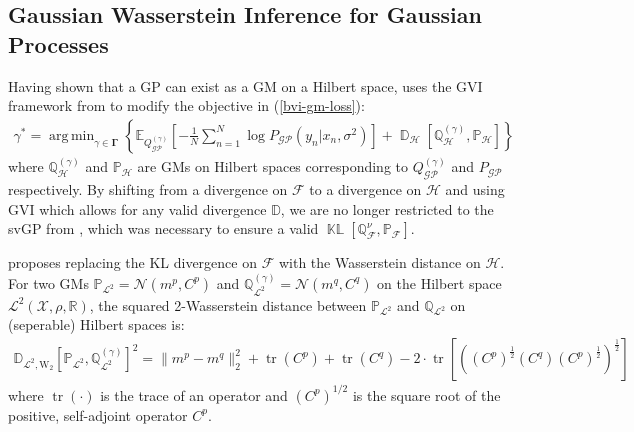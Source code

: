 \documentclass{article}
\newcommand{\KLD}{\operatorname{\mathbb{KL}}}
\newcommand{\D}{\operatorname{\mathbb{D}}}
\newcommand{\tr}{\operatorname{tr}}
\newcommand{\GP}{\operatorname{\mathcal{GP}}}
\DeclareMathOperator*{\argmin}{arg\,min}
\numberwithin{equation}{section}
\begin{document}
\subsection{Gaussian Wasserstein Inference for Gaussian Processes}
Having shown that a GP can exist as a GM on a Hilbert space, \cite{wild2022generalized} uses the GVI framework from \cite{knoblauch2022optimization} to modify the objective in (\ref{bvi-gm-loss}):
\begin{align}
    \label{gwi-objective}
    \gamma^* = \argmin_{\gamma \in \boldsymbol{\Gamma}}\left\{ \mathbb{E}_{Q^{(\gamma)}_{\GP}}\left[- \frac{1}{N}\sum_{n=1}^N \log P_{\GP}\left(y_n \vert x_n, \sigma^2\right) \right] + \D_{\mathcal{H}} \left[\mathbb{Q}^{(\gamma)}_{\mathcal{H}}, \mathbb{P}_{\mathcal{H}} \right]\right\}
\end{align}
where $\mathbb{Q}^{(\gamma)}_{\mathcal{H}}$ and $\mathbb{P}_{\mathcal{H}}$ are GMs on Hilbert spaces corresponding to $Q^{(\gamma)}_{\GP}$ and $P_{\GP}$ respectively. By shifting from a divergence on $\mathcal{F}$ to a divergence on $\mathcal{H}$ and using GVI which allows for any valid divergence $\mathbb{D}$, we are no longer restricted to the svGP from \cite{titsias2009variational}, which was necessary to ensure a valid $\KLD\left[\mathbb{Q}^{\nu}_{\mathcal{F}},  \mathbb{P}_{\mathcal{F}}\right]$.

\cite{wild2022generalized} proposes replacing the KL divergence on $\mathcal{F}$ with the Wasserstein distance on $\mathcal{H}$. For two GMs $\mathbb{P}_{\mathcal{L}^2} = \mathcal{N}(m^p, C^p)$ and $\mathbb{Q}^{(\gamma)}_{\mathcal{L}^2} = \mathcal{N}(m^q, C^q)$ on the Hilbert space $\mathcal{L}^2(\mathcal{X}, \rho, \mathbb{R})$, the squared 2-Wasserstein distance between $\mathbb{P}_{\mathcal{L}^2}$ and $\mathbb{Q}_{\mathcal{L}^2}$ on (seperable) Hilbert spaces is:
\begin{align}
    \mathbb{D}_{\mathcal{L}^2, \text{W}_2} \left[\mathbb{P}_{\mathcal{L}^2}, \mathbb{Q}^{(\gamma)}_{\mathcal{L}^2}\right]^2 = \| m^p - m^q\|_2^2 + \tr(C^p) + \tr(C^q) - 2 \cdot \tr \left[ \left( \left(C^p\right)^{\frac{1}{2}} \left(C^q\right) \left(C^p\right)^{\frac{1}{2}}\right)^{\frac{1}{2}}\right]
\end{align}
where $\tr(\cdot)$ is the trace of an operator and $\left(C^p\right)^{1/2}$ is the square root of the positive, self-adjoint operator $C^p$.
\end{document}
